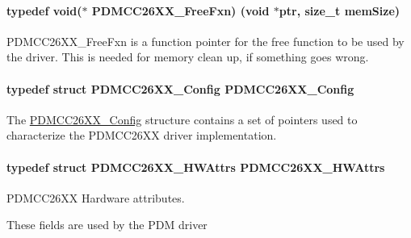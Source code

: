 \paragraph[{P\+D\+M\+C\+C26\+X\+X\+\_\+\+Free\+Fxn}]{\setlength{\rightskip}{0pt plus 5cm}typedef void($\ast$ P\+D\+M\+C\+C26\+X\+X\+\_\+\+Free\+Fxn) (void $\ast$ptr, size\+\_\+t mem\+Size)}\label{_p_d_m_c_c26_x_x_8h_af95e29fbea1fadfb011e4ceaa36f1ab0}


P\+D\+M\+C\+C26\+X\+X\+\_\+\+Free\+Fxn is a function pointer for the free function to be used by the driver. This is needed for memory clean up, if something goes wrong. 

\paragraph[{P\+D\+M\+C\+C26\+X\+X\+\_\+\+Config}]{\setlength{\rightskip}{0pt plus 5cm}typedef struct {\bf P\+D\+M\+C\+C26\+X\+X\+\_\+\+Config}  {\bf P\+D\+M\+C\+C26\+X\+X\+\_\+\+Config}}\label{_p_d_m_c_c26_x_x_8h_acfb1c3839ec53d02703f67f884760119}


The \hyperlink{struct_p_d_m_c_c26_x_x___config}{P\+D\+M\+C\+C26\+X\+X\+\_\+\+Config} structure contains a set of pointers used to characterize the P\+D\+M\+C\+C26\+X\+X driver implementation. 

\paragraph[{P\+D\+M\+C\+C26\+X\+X\+\_\+\+H\+W\+Attrs}]{\setlength{\rightskip}{0pt plus 5cm}typedef struct {\bf P\+D\+M\+C\+C26\+X\+X\+\_\+\+H\+W\+Attrs}  {\bf P\+D\+M\+C\+C26\+X\+X\+\_\+\+H\+W\+Attrs}}\label{_p_d_m_c_c26_x_x_8h_a0188ef7df22961ba87b588d2913e793e}


P\+D\+M\+C\+C26\+X\+X Hardware attributes. 

These fields are used by the P\+D\+M driver 
